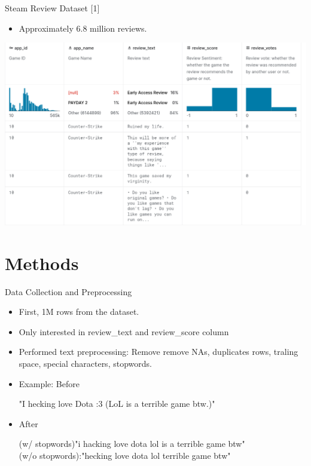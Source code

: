 \documentclass{beamer}
\begin{document}
\begin{frame}{Steam Review Dataset [1]}
\begin{itemize}
\item Approximately 6.8 million reviews.
\end{itemize}
\includegraphics[width = \textwidth]
{fig_1.png}
\centering
\end{frame}

\section{Methods}
\begin{frame}{Data Collection and Preprocessing}
\begin{itemize}
\item First, 1M rows from the dataset.
\item Only interested in review\_text and review\_score column
\item Performed text preprocessing: Remove remove NAs, duplicates rows, traling space, special characters, stopwords.
\item Example: Before
\begin{mybubble}
"I hecking love Dota :3 (LoL is a terrible game btw.)"
\end{mybubble}
\item  After
\begin{mybubble}
    (w/ stopwords)"i hacking love dota lol is a terrible game btw"\\
    (w/o stopwords):"hecking love dota lol terrible game btw"
\end{mybubble}
\end{itemize}
\end{frame}
\end{document}
